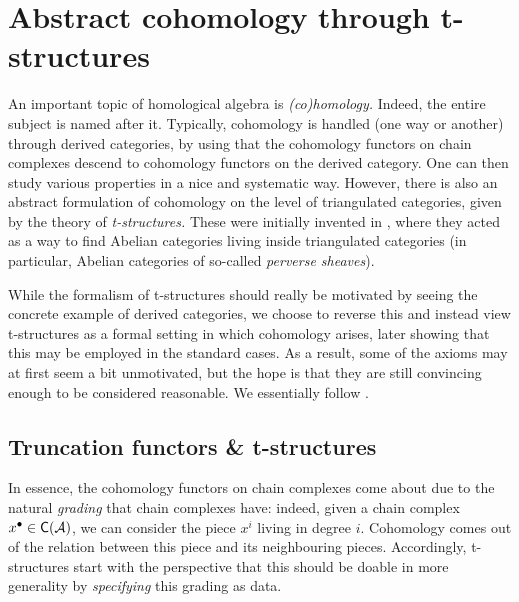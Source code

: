 
\section{Abstract cohomology through t-structures}\label{lecture:abstract-cohomology-through-t-structures}
An important topic of homological algebra is \emph{(co)homology.} Indeed, the entire subject is named after it. Typically, cohomology is handled (one way or another) through
derived categories, by using that the cohomology functors on chain complexes descend to cohomology functors on the derived category. One can then study various properties in a nice and systematic way.
However, there is also an abstract formulation of cohomology on the level of triangulated categories, given by the theory of \emph{t-structures.} These were initially
invented in \cite{faisceaux-pervers}, where they acted as a way to find Abelian categories living inside triangulated categories (in particular, Abelian categories of so-called \emph{perverse sheaves}).

While the formalism of t-structures should really be motivated by seeing the concrete example of derived categories, we choose to reverse this
and instead view t-structures as a formal setting in which cohomology arises, later showing that this may be employed in the standard cases.
As a result, some of the axioms may at first seem a bit unmotivated, but the hope is that they are still convincing enough to be considered reasonable. We essentially follow
\cite{kashiwara-schapira-book-2}.

\subsection{Truncation functors \& t-structures}
In essence, the cohomology functors on chain complexes come about due to the natural \emph{grading} that chain complexes have: indeed, given a chain complex \(x^\bullet\in\mathsf{C}(\mathcal{A})\), we can consider
the piece \(x^i\) living in degree \(i\). Cohomology comes out of the relation between this piece and its neighbouring pieces. Accordingly, t-structures start with the perspective that this
should be doable in more generality by \emph{specifying} this grading as data.

